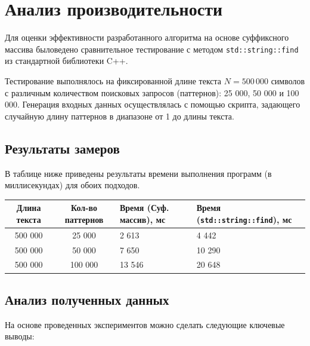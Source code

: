 \section{Анализ производительности}

Для оценки эффективности разработанного алгоритма на основе суффиксного массива быловедено сравнительное тестирование с методом \texttt{std::string::find} из стандартной библиотеки C++. 

Тестирование выполнялось на фиксированной длине текста $N = 500\,000$ символов с различным количеством поисковых запросов (паттернов): 25 000, 50 000 и 100 000. Генерация входных данных осуществлялась с помощью скрипта, задающего случайную длину паттернов в диапазоне от 1 до длины текста.

\subsection{Результаты замеров}

В таблице ниже приведены результаты времени выполнения программ (в миллисекундах) для обоих подходов.

\begin{table}[!ht]
\centering
\begin{tabular}{|c|c|p{4cm}|p{4cm}|}
\hline
\rowcolor{lightgray}
\textbf{Длина текста} & \textbf{Кол-во паттернов} & \textbf{Время (Суф. массив), мс} & \textbf{Время (\texttt{std::string::find}), мс} \\
\hline
500 000 & 25 000 & 2 613 & 4 442 \\
\hline
\rowcolor{lightgray}
500 000 & 50 000 & 7 650 & 10 290 \\
\hline
500 000 & 100 000 & 13 546 & 20 648 \\
\hline
\end{tabular}
\end{table}

\subsection{Анализ полученных данных}

На основе проведенных экспериментов можно сделать следующие ключевые выводы:

